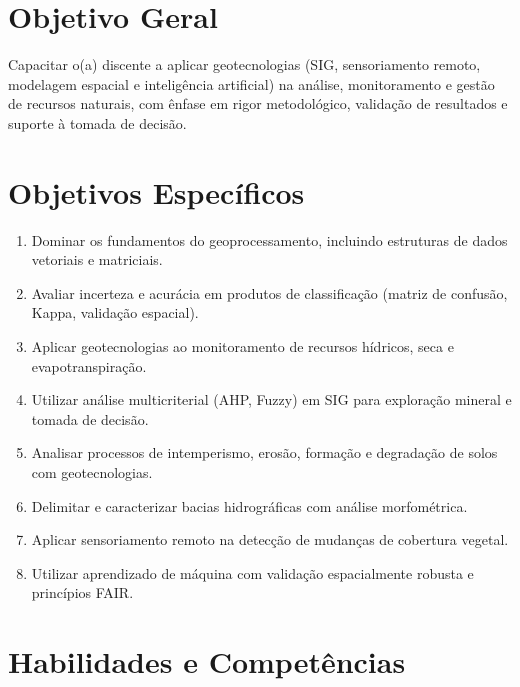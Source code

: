 \documentclass[11pt,a4paper]{article}
\begin{document}
\section*{Objetivo Geral}

Capacitar o(a) discente a aplicar geotecnologias (SIG, sensoriamento remoto, modelagem espacial e inteligência artificial) na análise, monitoramento e gestão de recursos naturais, com ênfase em rigor metodológico, validação de resultados e suporte à tomada de decisão.

\section*{Objetivos Específicos}

\begin{enumerate}

\item Dominar os fundamentos do geoprocessamento, incluindo estruturas de dados vetoriais e matriciais.

\item Avaliar incerteza e acurácia em produtos de classificação (matriz de confusão, Kappa, validação espacial).

\item Aplicar geotecnologias ao monitoramento de recursos hídricos, seca e evapotranspiração.

\item Utilizar análise multicriterial (AHP, Fuzzy) em SIG para exploração mineral e tomada de decisão.

\item Analisar processos de intemperismo, erosão, formação e degradação de solos com geotecnologias.

\item Delimitar e caracterizar bacias hidrográficas com análise morfométrica.

\item Aplicar sensoriamento remoto na detecção de mudanças de cobertura vegetal.

\item Utilizar aprendizado de máquina com validação espacialmente robusta e princípios FAIR.

\end{enumerate}

\section*{Habilidades e Competências}
\end{document}

